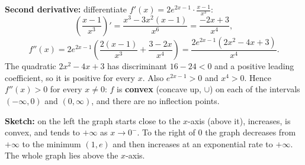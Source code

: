 \begin{solution}
\textbf{Second derivative:} differentiate $f'(x)=2e^{2x-1}\cdot\frac{x-1}{x^3}$:
\[ \left(\frac{x-1}{x^3}\right)' = \frac{x^3-3x^2(x-1)}{x^6} = \frac{-2x+3}{x^4}, \]
\[ f''(x) = 2e^{2x-1}\left(\frac{2(x-1)}{x^3}+\frac{3-2x}{x^4}\right) = \frac{2e^{2x-1}\left(2x^2-4x+3\right)}{x^4}. \]
The quadratic $2x^2-4x+3$ has discriminant $16-24<0$ and a positive leading coefficient, so it is positive for every $x$. Also $e^{2x-1}>0$ and $x^4>0$. Hence $f''(x)>0$ for every $x\ne0$:
$f$ is \textbf{convex} (concave up, $\cup$) on each of the intervals $(-\infty,0)$ and $(0,\infty)$, and there are no inflection points.

\textbf{Sketch:} on the left the graph starts close to the $x$-axis (above it), increases, is convex, and tends to $+\infty$ as $x\to0^-$. To the right of $0$ the graph decreases from $+\infty$ to the minimum $(1,e)$ and then increases at an exponential rate to $+\infty$. The whole graph lies above the $x$-axis.
\end{solution}
